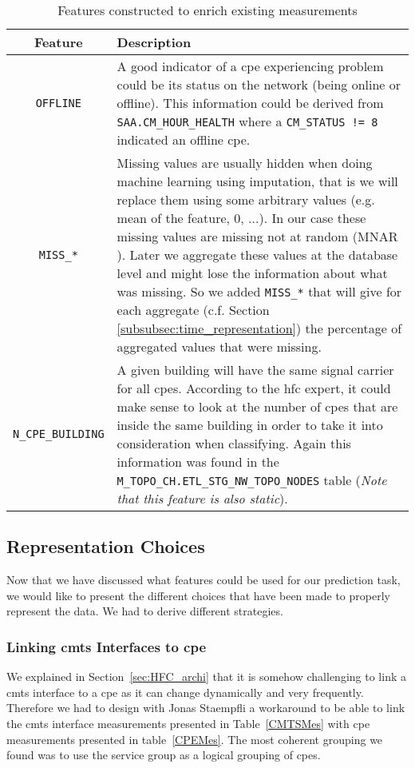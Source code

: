 \begin{table}[h]
\begin{center}
\begin{tabular}{c p{100mm}}
\hline
\textbf{Feature} & \textbf{Description}\\ 
\hline\hline
\texttt{OFFLINE} & A good indicator of a \acrshort{cpe} experiencing problem could be its status on the network (being online or offline). This information could be derived from \texttt{SAA.CM\_HOUR\_HEALTH} where a \texttt{CM\_STATUS != 8} indicated an offline \acrshort{cpe}.\\
\hline
\texttt{MISS\_*} & Missing values are usually hidden when doing machine learning using imputation, that is we will replace them using some arbitrary values (e.g. mean of the feature, 0, ...). In our case these missing values are missing not at random (MNAR \cite{wiki:mnar}). Later we aggregate these values at the database level and might lose the information about what was missing. So we added \texttt{MISS\_*} that will give for each aggregate (c.f. Section \ref{subsubsec:time_representation}) the percentage of aggregated values that were missing.\\
\hline
\texttt{N\_CPE\_BUILDING} & A given building will have the same signal carrier for all \acrshort{cpe}s. According to the \acrshort{hfc} expert, it could make sense to look at the number of \acrshort{cpe}s that are inside the same building in order to take it into consideration when classifying. Again this information was found in the \texttt{M\_TOPO\_CH.ETL\_STG\_NW\_TOPO\_NODES} table (\textit{Note that this feature is also static}).\\
\end{tabular}
\end{center}
\caption{\label{CreatedMes}Features constructed to enrich existing measurements}
\end{table}


\subsection{Representation Choices}
Now that we have discussed what features could be used for our prediction task, we would like to present the different choices that have been made to properly represent the data. We had to derive different strategies. 

\subsubsection{Linking \acrshort{cmts} Interfaces to \acrshort{cpe}}
We explained in Section~\ref{sec:HFC_archi} that it is somehow challenging to link a \acrshort{cmts} interface to a \acrshort{cpe} as it can change dynamically and very frequently. Therefore we had to design with Jonas Staempfli a workaround to be able to link the \acrshort{cmts} interface measurements presented in Table~\ref{CMTSMes} with \acrshort{cpe} measurements presented in table~\ref{CPEMes}. The most coherent grouping we found was to use the service group as a logical grouping of \acrshort{cpe}s. 

